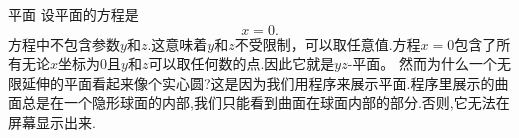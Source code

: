 ﻿\begin{surferPage}[平面]{平面}
设平面的方程是\[x=0.\]方程中不包含参数$y$和$z$.这意味着$y$和$z$不受限制，可以取任意值.方程$x=0$包含了所有无论$x$坐标为0且$y$和$z$可以取任何数的点.因此它就是$yz$-平面。
\newline \newline
然而为什么一个无限延伸的平面看起来像个实心圆?这是因为我们用程序来展示平面.程序里展示的曲面总是在一个隐形球面的内部,我们只能看到曲面在球面内部的部分.否则,它无法在屏幕显示出来.
\end{surferPage}

